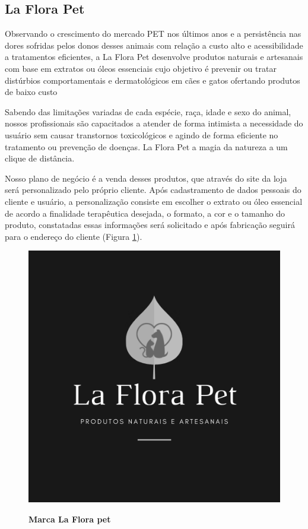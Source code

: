 \subsection{La Flora Pet}

Observando o crescimento do mercado PET nos últimos anos e a persistência nas dores sofridas pelos donos desses animais com relação a custo alto e acessibilidade a tratamentos eficientes, a La Flora Pet desenvolve produtos naturais e artesanais com base em extratos ou óleos essenciais cujo objetivo é prevenir ou tratar distúrbios comportamentais e dermatológicos em cães e gatos ofertando produtos de baixo custo

Sabendo das limitações variadas de cada espécie, raça, idade e sexo do animal, nossos profissionais são capacitados a atender de forma intimista a necessidade do usuário sem causar transtornos toxicológicos e agindo de forma eficiente no tratamento ou prevenção de doenças. La Flora Pet a magia da natureza a um clique de distância.

Nosso plano de negócio é a venda desses produtos, que através do site da loja será personalizado pelo próprio cliente. Após cadastramento de dados pessoais do cliente e usuário, a personalização consiste em escolher o extrato ou óleo essencial de acordo a finalidade terapêutica desejada, o formato, a cor e o tamanho do produto, constatadas essas informações será solicitado e após fabricação seguirá para o endereço do cliente (Figura \ref{figura_24}).


\begin{figure}[H]
\centering
\caption{\textbf{Marca La Flora pet}}
\includegraphics[scale=4.5]{Imagens/laflorapet.png}
\label{figura_24}
\end{figure}



